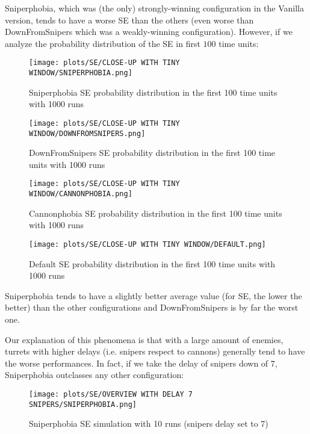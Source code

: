 \documentclass[
10pt, %
a4paper, %
oneside, %
headinclude,footinclude, %
BCOR5mm, %
]{scrartcl}
\begin{document}
			Sniperphobia, which was (the only) strongly-winning configuration in the Vanilla version, tends to have a worse SE than the others (even worse than DownFromSnipers which was a weakly-winning configuration).
			However, if we analyze the probability distribution of the SE in first $100$ time units:
			\begin{figure}[H]
				\centering
				\begin{minipage}{.35\textwidth}
					\centering
					\texttt{[image: plots/SE/CLOSE-UP WITH TINY WINDOW/SNIPERPHOBIA.png]}
					\caption{Sniperphobia SE probability distribution in the first 100 time units with 1000 runs}
				\end{minipage}
				\begin{minipage}{.35\textwidth}
					\centering
					\texttt{[image: plots/SE/CLOSE-UP WITH TINY WINDOW/DOWNFROMSNIPERS.png]}
					\caption{DownFromSnipers SE probability distribution in the first 100 time units with 1000 runs}
				\end{minipage}
			\end{figure}
			\begin{figure}[H]
				\centering
				\begin{minipage}{.35\textwidth}
					\centering
					\texttt{[image: plots/SE/CLOSE-UP WITH TINY WINDOW/CANNONPHOBIA.png]}
					\caption{Cannonphobia SE probability distribution in the first 100 time units with 1000 runs}
				\end{minipage}
				\begin{minipage}{.35\textwidth}
					\centering
					\texttt{[image: plots/SE/CLOSE-UP WITH TINY WINDOW/DEFAULT.png]}
					\caption{Default SE probability distribution in the first 100 time units with 1000 runs}
				\end{minipage}
			\end{figure}
			Sniperphobia tends to have a slightly better average value (for SE, the lower the better) than the other configurations and DownFromSnipers is by far the worst one.
			
			Our explanation of this phenomena is that with a large amount of enemies, turrets with higher delays (i.e. snipers respect to cannons) generally tend to have the worse performances. In fact, if we take the delay of snipers down of 7, Sniperphobia outclasses any other configuration:
			\begin{figure}[H]
				\centering
				\texttt{[image: plots/SE/OVERVIEW WITH DELAY 7 SNIPERS/SNIPERPHOBIA.png]}
				\caption{Sniperphobia SE simulation with 10 runs (snipers delay set to 7)}
			\end{figure}
			
\end{document}
